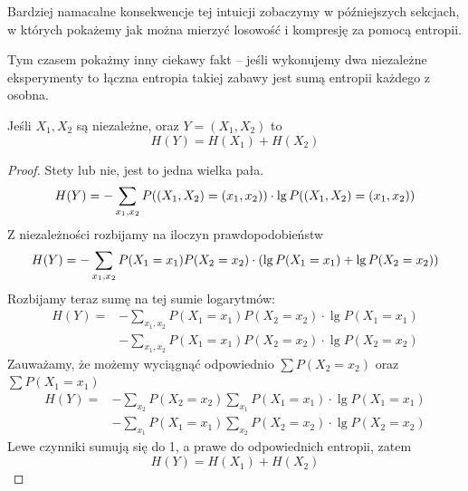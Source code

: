 Bardziej namacalne konsekwencje tej intuicji zobaczymy w późniejszych sekcjach, w których pokażemy jak można mierzyć losowość i kompresję za pomocą entropii.

Tym czasem pokażmy inny ciekawy fakt -- jeśli wykonujemy dwa niezależne eksperymenty to łączna entropia takiej zabawy jest sumą entropii każdego z osobna.

\begin{theorem}[Lemat 10.1 P\&C]
    Jeśli \( X_1, X_2 \) są niezależne, oraz \( Y = (X_1, X_2) \) to
    \[
        H(Y) = H(X_1) + H(X_2)
    \]
\end{theorem}
\begin{proof}
    Stety lub nie, jest to jedna wielka pała.
    \[
        H(Y) = -\sum_{x_1, x_2} P\pars{(X_1, X_2) = (x_1, x_2)} \cdot \lg P\pars{(X_1, X_2) = (x_1, x_2)}
    \]
    Z niezależności rozbijamy na iloczyn prawdopodobieństw
    \[
         H(Y) = -\sum_{x_1, x_2} P(X_1=x_1)P(X_2=x_2) \cdot \left(\lg P(X_1=x_1) + \lg P(X_2=x_2)\right)
    \]
    Rozbijamy teraz sumę na tej sumie logarytmów:
    \begin{align*}
         H(Y) = &-\sum_{x_1, x_2} P(X_1=x_1)P(X_2=x_2) \cdot \lg P(X_1=x_1) \\
                &-\sum_{x_1, x_2} P(X_1=x_1)P(X_2=x_2) \cdot \lg P(X_2=x_2) 
    \end{align*}
    Zauważamy, że możemy wyciągnąć odpowiednio \( \sum P(X_2 = x_2) \) oraz \( \sum P(X_1 = x_1) \)
    \begin{align*}
         H(Y) = &-\sum_{x_2} P(X_2 = x_2) \sum_{x_1} P(X_1=x_1) \cdot \lg P(X_1=x_1) \\
                &-\sum_{x_1} P(X_1 = x_1) \sum_{x_2} P(X_2=x_2) \cdot \lg P(X_2=x_2) 
    \end{align*}
    Lewe czynniki sumują się do 1, a prawe do odpowiednich entropii, zatem
    \[
        H(Y) = H(X_1) + H(X_2)
    \]
\end{proof}